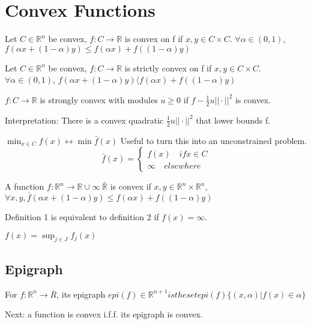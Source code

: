 \documentclass[11pt,fleqn]{book} %
\def\R{\mathbb{R}}
\begin{document}
\section{Convex Functions}
\begin{definition}
Let $C \in \R^n$ be convex, $f:C \to \R$ is convex on f if $x,y \in C \times C$. $\forall \alpha \in (0,1)$, $f(\alpha x + (1-\alpha) y) \le f(\alpha x) + f((1-\alpha) y)$
\end{definition}

\begin{definition}
Let $C \in \R^n$ be convex, $f:C \to \R$ is strictly convex on f if $x,y \in C \times C$. $\forall \alpha \in (0,1)$, $f(\alpha x + (1-\alpha) y) \langle f(\alpha x) + f((1-\alpha) y)$
\end{definition}

\begin{definition}
$f:C \to \R$ is strongly convex with modules $u \ge 0$ if $f - \frac{1}{2}u || \cdot ||^2$ is convex.
\end{definition}
Interpretation: There is a convex quadratic $\frac{1}{2}u || \cdot ||^2$ that lower bounds f.
\begin{example}
$\min_{x \in C} f(x) \leftrightarrow \min \bar{f}(x)$
Useful to turn this into an unconstrained problem. \\
$$\bar{f}(x) = \begin{cases}
f(x) \quad if x \in C \\
\infty \quad  elsewhere
\end{cases}$$
\end{example}
\begin{definition}
A function $f : \R^n \to \R \cup \infty \ \bar{\R}$ is convex if $x,y \in \R^n \times \R^n$, $\forall x,y , \bar{f}(\alpha x + (1-\alpha) y) \le f(\alpha x) + f((1-\alpha) y)$
\end{definition}
Definition 1 is equivalent to definition 2 if $f(x) = \infty$.
\begin{example}
$f(x) = \sup_{j \in J} f_j(x)$
\end{example}

\subsection{Epigraph} 
\begin{definition}[Epigraph]
For $f: \R^n \rightarrow \bar{R}$, its epigraph $epi(f) \in \R^{n+1} is the set epi(f) \{ (x,\alpha) | f(x) \in \alpha \}$
\end{definition}
Next: a function is convex i.f.f. its epigraph is convex.
\end{document}
